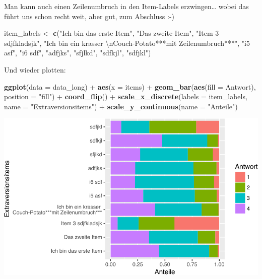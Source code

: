 \documentclass[12pt,ngerman,]{book}
\newenvironment{Shaded}{\begin{snugshade}}{\end{snugshade}}
\newcommand{\KeywordTok}[1]{\textcolor[rgb]{0.13,0.29,0.53}{\textbf{{#1}}}}
\newcommand{\DataTypeTok}[1]{\textcolor[rgb]{0.13,0.29,0.53}{{#1}}}
\newcommand{\CharTok}[1]{\textcolor[rgb]{0.31,0.60,0.02}{{#1}}}
\newcommand{\StringTok}[1]{\textcolor[rgb]{0.31,0.60,0.02}{{#1}}}
\newcommand{\NormalTok}[1]{{#1}}
\renewenvironment{Shaded}{\begin{kframe}}{\end{kframe}}
\begin{document}
Man kann auch einen Zeilenumbruch in den Item-Labels erzwingen\ldots{}
wobei das führt uns schon recht weit, aber gut, zum Abschluss :-)

\begin{Shaded}
\begin{Highlighting}[]
\NormalTok{item_labels <-}\StringTok{ }\KeywordTok{c}\NormalTok{(}\StringTok{"Ich bin das erste Item"}\NormalTok{,}
                 \StringTok{"Das zweite Item"}\NormalTok{,}
                 \StringTok{"Item 3 sdjfkladsjk"}\NormalTok{,}
                 \StringTok{"Ich bin ein krasser }\CharTok{\textbackslash{}n}\StringTok{Couch-Potato***mit Zeilenumbruch***"}\NormalTok{,}
\StringTok{"i5 asf"}\NormalTok{, }\StringTok{"i6 sdf"}\NormalTok{, }\StringTok{"adfjks"}\NormalTok{, }\StringTok{"sfjlkd"}\NormalTok{, }\StringTok{"sdfkjl"}\NormalTok{, }\StringTok{"sdfjkl"}\NormalTok{)}
\end{Highlighting}
\end{Shaded}

Und wieder plotten:

\begin{Shaded}
\begin{Highlighting}[]
\KeywordTok{ggplot}\NormalTok{(}\DataTypeTok{data =} \NormalTok{data_long) +}
\StringTok{  }\KeywordTok{aes}\NormalTok{(}\DataTypeTok{x =} \NormalTok{items)  +}
\StringTok{  }\KeywordTok{geom_bar}\NormalTok{(}\KeywordTok{aes}\NormalTok{(}\DataTypeTok{fill =} \NormalTok{Antwort), }\DataTypeTok{position =} \StringTok{"fill"}\NormalTok{) +}
\StringTok{  }\KeywordTok{coord_flip}\NormalTok{() +}
\StringTok{  }\KeywordTok{scale_x_discrete}\NormalTok{(}\DataTypeTok{labels =} \NormalTok{item_labels, }\DataTypeTok{name =} \StringTok{"Extraversionsitems"}\NormalTok{) +}
\StringTok{  }\KeywordTok{scale_y_continuous}\NormalTok{(}\DataTypeTok{name =} \StringTok{"Anteile"}\NormalTok{)}
\end{Highlighting}
\end{Shaded}

\begin{center}\includegraphics[width=0.7\linewidth]{056_Fallstudie_Visualisierung_files/figure-latex/unnamed-chunk-14-1} \end{center}
\end{document}
